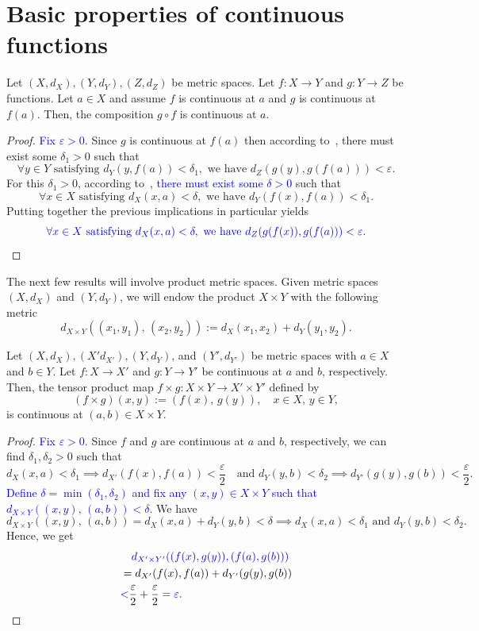 \section{Basic properties of continuous functions}
\label{sec:basic_prop_cts}
\begin{prop}
	\label{prop:comp_cts}
	Let $(X,d_X),(Y,d_Y),(Z,d_Z)$ be metric spaces. Let $f:X\to Y$ and $g:Y \to Z$ be functions. Let $a\in X$ and assume $f$ is continuous at $a$ and $g$ is continuous at $f(a)$. Then, the composition $g\circ f$ is continuous at $a$.
\end{prop}
\begin{proof}
	\textcolor{blue}{Fix $\varepsilon>0$.} Since $g$ is continuous at $f(a)$ then according to~, there must exist some $\delta_1>0$ such that
	\[
	\forall y \in Y \text{ satisfying }d_Y(y,f(a))<\delta_1,\text{ we have }d_Z(g(y),g(f(a)))<\varepsilon.
	\]
	For this $\delta_1>0$, according to~, \textcolor{blue}{there must exist some $\delta>0$} such that
	\[
	\forall x \in X\text{ satisfying }d_X(x,a) < \delta,\text{ we have }d_Y(f(x),f(a))<\delta_1.
	\]
	Putting together the previous implications in particular yields
	\[
	\textcolor{blue}{\forall x \in X\text{ satisfying }d_X(x,a)<\delta,\text{ we have }d_Z(g(f(x)),g(f(a)))<\varepsilon.}
	\]
\end{proof}
The next few results will involve product metric spaces. Given metric spaces $(X,d_X)$ and $(Y,d_Y)$, we will endow the product $X\times Y$ with the following metric
\[
d_{X\times Y}((x_1,y_1),\,(x_2,y_2)):= d_X(x_1,x_2) + d_Y(y_1,y_2).
\]
\begin{prop}
	\label{prop:tens_prod_cts}
	Let $(X,d_X),(X'd_{X'}),(Y,d_Y)$, and $(Y',d_{Y'})$ be metric spaces with $a\in X$ and $b\in Y$. Let $f:X\to X'$ and $g:Y \to Y'$ be continuous at $a$ and $b$, respectively. Then, the tensor product map $f\times g :X\times Y \to X'\times Y'$ defined by
	\[
	(f\times g)(x,y) := (f(x),\,g(y)),\quad x\in X,\,y \in Y,
	\]
	is continuous at $(a,b) \in X\times Y$.
\end{prop}
\begin{proof}
	\textcolor{blue}{Fix $\varepsilon>0$.} Since $f$ and $g$ are continuous at $a$ and $b$, respectively, we can find $\delta_1,\delta_2>0$ such that
	\[
	d_X(x,a)<\delta_1\implies d_{X'}(f(x),f(a))<\frac{\varepsilon}{2}\quad\text{and }d_Y(y,b)<\delta_2\implies d_{Y'}(g(y),g(b))<\frac{\varepsilon}{2}.
	\]
	\textcolor{blue}{Define $\delta=\min(\delta_1,\delta_2)$ and fix any $(x,y) \in X\times Y$ such that $d_{X\times Y}((x,y),\,(a,b))<\delta$.} We have
	\[
	d_{X\times Y}((x,y),\,(a,b)) = d_X(x,a) + d_Y(y,b)<\delta \implies d_X(x,a)<\delta_1\text{ and }d_Y(y,b) < \delta_2.
	\] 
	Hence, we get
	\begin{align*}
		&\quad \textcolor{blue}{d_{X'\times Y'}((f(x),g(y)),(f(a),g(b)))} 	\\
		&= d_{X'}(f(x),f(a)) + d_{Y'}(g(y),g(b)) 	\\
		&\textcolor{blue}{<} \frac{\varepsilon}{2} + \frac{\varepsilon}{2} = \textcolor{blue}{\varepsilon.}
	\end{align*}
\end{proof}
